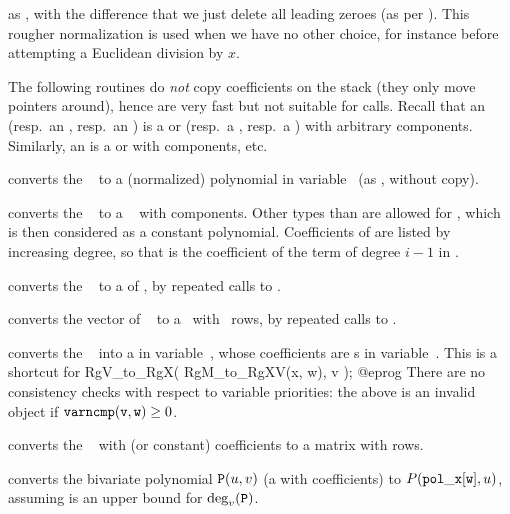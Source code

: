  as ,
with the difference that we just delete all leading zeroes (as per
). This rougher normalization is used when we have no other
choice, for instance before attempting a Euclidean division by $x$.

The following routines do \emph{not} copy coefficients on the stack (they
only move pointers around), hence are very fast but not suitable for
 calls. Recall that an  (resp.~an , resp.~an
) is a  or  (resp.~a , resp.~a )
with arbitrary components. Similarly, an  is a  or
 with  components, etc.

 converts the ~ to a
(normalized) polynomial in variable~ (as , without
copy).

 converts the ~ to a
~ with  components. Other types than  are
allowed for , which is then considered as a constant polynomial.
Coefficients of  are listed by increasing degree, so that 
is the coefficient of the term of degree $i-1$ in .

 converts the ~ to a
 of , by repeated calls to .

 converts the vector of ~
to a~ with ~rows, by repeated calls to .

 converts the ~ into
a  in variable~, whose coefficients are s in
variable~. This is a shortcut for
\bprog
  RgV_to_RgX( RgM_to_RgXV(x, w), v );
@eprog\noindent
There are no consistency checks with respect to variable
priorities: the above is an invalid object if ${\tt varncmp(v, w)} \geq 0$.

 converts the ~ with
 (or constant) coefficients to a matrix with  rows.

 converts the bivariate polynomial
${\tt P}(u,v)$ (a  with  coefficients) to
$P({\tt pol\_x[w]},u)$, assuming  is an upper bound for
$\deg_v({\tt P})$.

